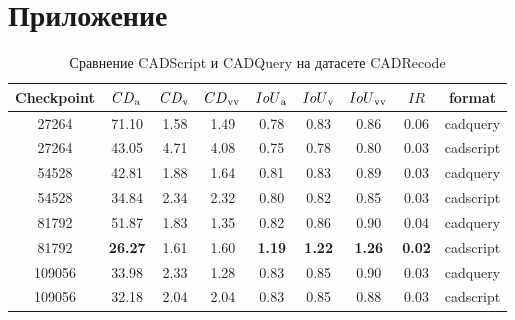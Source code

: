 \section*{Приложение}
\label{sec:Apendix} 

\begin{table}[]
	\caption{Сравнение CADScript и CADQuery на датасете CADRecode}
	\centering
	\begin{tabular}{ccccccccc}
		\hline
		\textbf{Checkpoint} & $CD\textsubscript{a}$ & $CD\textsubscript{v}$ & $CD\textsubscript{vv}$ & $IoU\textsubscript{a}$ & $IoU\textsubscript{v}$ & $IoU\textsubscript{vv}$ & $IR$          & format    \\
		\hline
		27264               & 71.10                 & 1.58                  & 1.49                   & 0.78                   & 0.83                   & 0.86                    & 0.06          & cadquery  \\
		27264               & 43.05                 & 4.71                  & 4.08                   & 0.75                   & 0.78                   & 0.80                    & 0.03          & cadscript \\
		54528               & 42.81                 & 1.88                  & 1.64                   & 0.81                   & 0.83                   & 0.89                    & 0.03          & cadquery  \\
		54528               & 34.84                 & 2.34                  & 2.32                   & 0.80                   & 0.82                   & 0.85                    & 0.03          & cadscript \\
		81792               & 51.87                 & 1.83                  & 1.35                   & 0.82                   & 0.86                   & 0.90                    & 0.04          & cadquery  \\
		81792               & \textbf{26.27}        & 1.61                  & 1.60                   & \textbf{1.19}          & \textbf{1.22}          & \textbf{1.26}           & \textbf{0.02} & cadscript \\
		109056              & 33.98                 & 2.33                  & 1.28                   & 0.83                   & 0.85                   & 0.90                    & 0.03          & cadquery  \\
		109056              & 32.18                 & 2.04                  & 2.04                   & 0.83                   & 0.85                   & 0.88                    & 0.03          & cadscript \\

\end{tabular}
\end{table}
